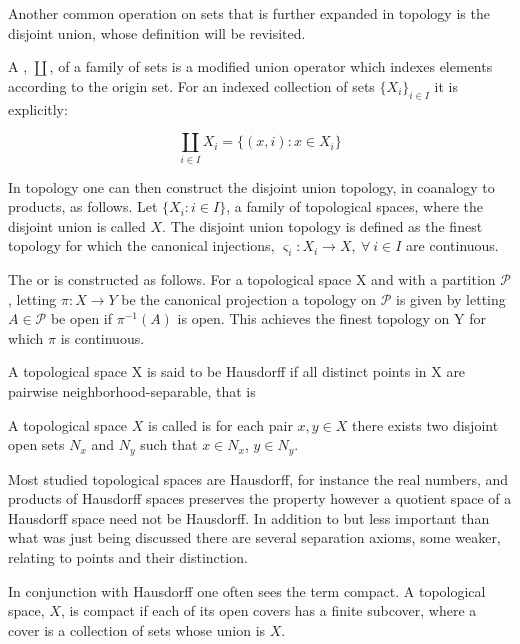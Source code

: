 \documentclass[../../main.tex]{subfiles}
\begin{document}
    Another common operation on sets that is further expanded in topology is the disjoint union, whose definition will be revisited. 

    \begin{definition}
        A , $\coprod$, of a family of sets is a modified union operator which indexes elements according to the origin set. For an indexed collection of sets $\{X_i\}_{i \in I}$ it is explicitly:

        \begin{equation*}
            \coprod_{i \in I} X_i = \{(x, i): x \in X_i\}
        \end{equation*}
    \end{definition}
    
    In topology one can then construct the disjoint union topology, in coanalogy to products, as follows. Let $\{X_i : i \in I\}$, a family of topological spaces, where the disjoint union is called $X$. The disjoint union topology is defined as the finest topology for which the canonical injections, $\varsigma_i :X_i\to X, \: \forall\: i \in I$ are continuous.
    
    The  or  is constructed as follows. For a topological space X and with a partition $\mathcal{P}$, letting $\pi:X \to Y$ be the canonical projection a topology on $\mathcal{P}$ is given by letting $A \in \mathcal{P}$ be open if $\pi^{-1}(A)$ is open. This achieves the finest topology on Y for which $\pi$ is continuous.
    
    A topological space X is said to be Hausdorff if all distinct points in X are pairwise neighborhood-separable, that is
    
    \begin{definition}
        A topological space $X$ is called  is for each pair $x, y \in X$ there exists two disjoint open sets $N_x$ and $N_y$ such that $x \in N_x$, $y \in N_y$.
    \end{definition}
    
    Most studied topological spaces are Hausdorff, for instance the real numbers, and products of Hausdorff spaces preserves the property however a quotient space of a Hausdorff space need not be Hausdorff. In addition to but less important than what was just being discussed there are several separation axioms, some weaker, relating to points and their distinction. 
    
    In conjunction with Hausdorff one often sees the term compact. A topological space, $X$, is compact if each of its open covers has a finite subcover, where a cover is a collection of sets whose union is $X$.
\end{document}
